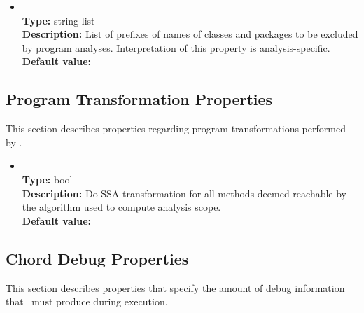 \begin{itemize}
\item
{} \\
{\bf Type:} string list \\
{\bf Description:} List of prefixes of names of classes and packages to be excluded by program analyses.  Interpretation of this property is analysis-specific. \\
{\bf Default value:} 
\end{itemize}

\subsection{Program Transformation Properties}

This section describes properties regarding program transformations performed by \Chord.

\begin{itemize}
\item
{} \\
{\bf Type:} bool \\
{\bf Description:} Do SSA transformation for all methods deemed reachable by the algorithm used to compute analysis scope. \\
{\bf Default value:}  
\end{itemize}

\subsection{Chord Debug Properties}

This section describes properties that specify the amount of debug information that \Chord\ must produce during execution.

